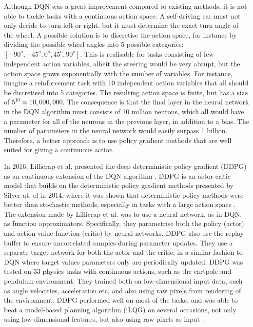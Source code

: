 \documentclass[class=book, crop=false]{standalone}
\begin{document}
Although DQN was a great improvement compared to existing methods, it is not able to tackle tasks with a continuous action space. A self-driving car must not only decide to turn left or right, but it must determine the exact turn angle of the wheel. A possible solution is to discretise the action space, for instance by dividing the possible wheel angles into 5 possible categories: $[-90^{o},-45^{o},0^{o},45^{o},90^{o}]$. This is realisable for tasks consisting of few independent action variables, albeit the steering would be very abrupt, but the action space grows exponentially with the number of variables. For instance, imagine a reinforcement task with 10 independent action variables that all should be discretised into 5 categories. The resulting action space is finite, but has a size of $5^{10} \approx 10, 000,000$. The consequence is that the final layer in the neural network in the DQN algorithm must consists of 10 million neurons, which all would have a parameter for all of the neurons in the previous layer, in addition to a bias. The number of parameters in the neural network would easily surpass 1 billion. Therefore, a better approach is to use policy gradient methods that are well suited for giving a continuous action. 


In 2016, Lillicrap et al. presented the deep deterministic policy gradient (DDPG) as an continuous extension of the DQN algorithm  \cite{DBLP:journals/corr/LillicrapHPHETS15}. DDPG is an actor-critic model that builds on the deterministic policy gradient methods presented by Silver at. el in 2014, where it was shown that deterministic policy methods were better than stochastic methods, especially in tasks with a large action space \cite{pmlr-v32-silver14}. The extension made by Lillicrap et al. was to use a neural network, as in DQN, as function approximators. Specifically, they parametrise both the policy (actor) and action-value function (critic) by neural networks. DDPG also use the replay buffer to ensure uncorrelated samples during parameter updates. They use a separate target network for both the actor and the critic, in a similar fashion to DQN where target values parameters only are periodically updated. DDPG was tested on 33 physics tasks with continuous actions, such as the cartpole and pendulum  environment. They trained both on low-dimensional input data, such as angle velocities, acceleration etc, and also using raw pixels from rendering of the environment. DDPG performed well on most of the tasks, and was able to beat a model-based planning algorithm (iLQG) on several occasions, not only using low-dimensional features, but also using raw pixels as input \cite{DBLP:journals/corr/LillicrapHPHETS15}.
\end{document}
